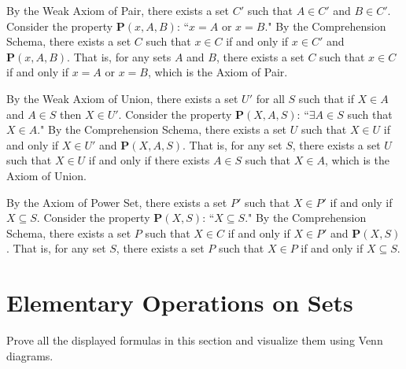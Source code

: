 \documentclass[class=report, crop=false]{standalone}
\begin{document}
  \begin{solution}
    By the Weak Axiom of Pair, there exists a set \(C'\) such that \(A \in C'\) and \(B \in C'\). Consider the property \(\textbf{P}(x, A, B)\): ``\(x = A\) or \(x = B\)." By the Comprehension Schema, there exists a set \(C\) such that \(x \in C\) if and only if \(x \in C'\) and \(\textbf{P}(x, A, B)\).
    That is, for any sets \(A\) and \(B\), there exists a set \(C\) such that \(x \in C\) if and only if \(x = A\) or \(x = B\), which is the Axiom of Pair.

    By the Weak Axiom of Union, there exists a set \(U'\) for all \(S\) such that if \(X \in A\) and \(A \in S\) then \(X \in U'\). Consider the property \(\textbf{P}(X, A, S)\): ``\(\exists A \in S\) such that \(X \in A\)." By the Comprehension Schema, there exists a set \(U\) such that \(X \in U\) if and only if \(X \in U'\) and \(\textbf{P}(X, A, S)\).
    That is, for any set \(S\), there exists a set \(U\) such that \(X \in U\) if and only if there exists \(A \in S\) such that \(X \in A\), which is the Axiom of Union.

    By the Axiom of Power Set, there exists a set \(P'\) such that \(X \in P'\) if and only if \(X \subseteq S\). Consider the property \(\textbf{P}(X, S)\): ``\(X \subseteq S\)." By the Comprehension Schema, there exists a set \(P\) such that \(X \in C\) if and only if \(X \in P'\) and \(\textbf{P}(X, S)\).
    That is, for any set \(S\), there exists a set \(P\) such that \(X \in P\) if and only if \(X \subseteq S\).
  \end{solution}


  \section{Elementary Operations on Sets}

  \begin{problem}
    Prove all the displayed formulas in this section and visualize them using Venn diagrams.
  \end{problem}
\end{document}
